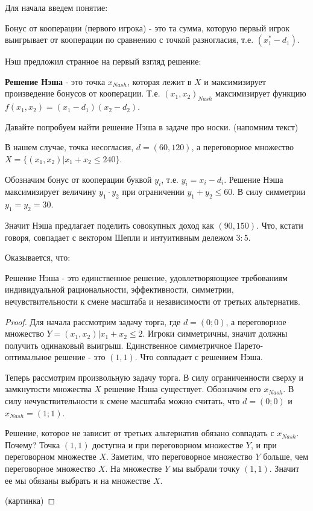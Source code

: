 Для начала введем понятие:

Бонус от кооперации (первого игрока) - это та сумма, которую первый
игрок выигрывает от кооперации по сравнению с точкой разногласия,
т.е. $(x_{1}^{*}-d_{1})$. 

Нэш предложил странное на первый взгляд решение: 

\begin{definition} \textbf{Решение Нэша} - это точка $x_{Nash}$, которая
лежит в $X$ и максимизирует произведение бонусов от кооперации. Т.е.
$(x_{1},x_{2})_{Nash}$ максимизирует функцию $f(x_{1},x_{2})=(x_{1}-d_{1})(x_{2}-d_{2})$.
\end{definition}

Давайте попробуем найти решение Нэша в задаче про носки. (напомним
текст)

В нашем случае, точка несогласия, $d=(60,120)$, а переговорное множество
$X=\{(x_{1},x_{2})|x_{1}+x_{2}\leq240\}$.

Обозначим бонус от кооперации буквой $y_{i}$, т.е. $y_{i}=x_{i}-d_{i}$.
Решение Нэша максимизирует величину $y_{1}\cdot y_{2}$ при ограничении
$y_{1}+y_{2}\leq60$. В силу симметрии $y_{1}=y_{2}=30$.

Значит Нэша предлагает поделить совокупных доход как $(90,150)$.
Что, кстати говоря, совпадает с вектором Шепли и интуитивным дележом
$3:5$.

Оказывается, что:

\begin{theorem} Решение Нэша - это единственное решение, удовлетворяющиее
требованиям индивидуальной рациональности, эффективности, симметрии,
нечувствительности к смене масштаба и независимости от третьих альтернатив.
\end{theorem}

\begin{proof} 

Для начала рассмотрим задачу торга, где $d=(0;0)$, а переговорное
множество $Y={(x_{1},x_{2})|x_{1}+x_{2}\leq2}$. Игроки симметричны,
значит должны получить одинаковый выигрыш. Единственное симметричное
Парето-оптимальное решение - это $(1,1)$. Что совпадает с решением
Нэша.

Теперь рассмотрим произвольную задачу торга. В силу ограниченности
сверху и замкнутости множества $X$ решение Нэша существует. Обозначим
его $x_{Nash}.$ В силу нечувствительности к смене масштаба можно
считать, что $d=(0;0)$ и $x_{Nash}=(1;1)$.

Решение, которое не зависит от третьих альтернатив обязано совпадать
с $x_{Nash}.$ Почему? Точка $(1,1)$ доступна и при переговорном
множестве $Y$, и при переговорном множестве $X$. Заметим, что переговорное
множество $Y$ больше, чем переговорное множество $X$. На множестве
$Y$ мы выбрали точку $(1,1)$. Значит ее мы обязаны выбрать и на
множестве $X$.

(картинка)

\end{proof}


